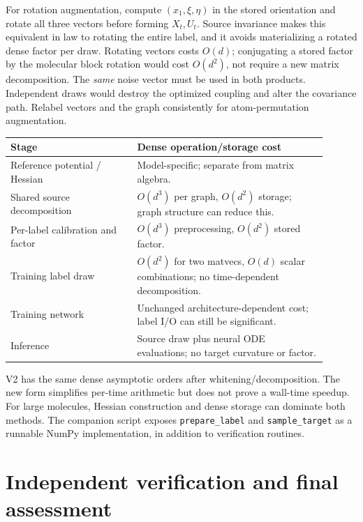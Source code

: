 \documentclass[11pt,letterpaper]{article}
\begin{document}
For rotation augmentation, compute $(x_1,\xi,\eta)$ in the stored orientation and rotate all three vectors before forming $X_t,U_t$. Source invariance makes this equivalent in law to rotating the entire label, and it avoids materializing a rotated dense factor per draw. Rotating vectors costs $O(d)$; conjugating a stored factor by the molecular block rotation would cost $O(d^2)$, not require a new matrix decomposition. The \emph{same} noise vector must be used in both products. Independent draws would destroy the optimized coupling and alter the covariance path. Relabel vectors and the graph consistently for atom-permutation augmentation.

\begin{center}\small
\begin{tabular}{p{0.36\linewidth}p{0.54\linewidth}}
\toprule
Stage & Dense operation/storage cost\\\midrule
Reference potential / Hessian & Model-specific; separate from matrix algebra.\\
Shared source decomposition & $O(d^3)$ per graph, $O(d^2)$ storage; graph structure can reduce this.\\
Per-label calibration and factor & $O(d^3)$ preprocessing, $O(d^2)$ stored factor.\\
Training label draw & $O(d^2)$ for two matvecs, $O(d)$ scalar combinations; no time-dependent decomposition.\\
Training network & Unchanged architecture-dependent cost; label I/O can still be significant.\\
Inference & Source draw plus neural ODE evaluations; no target curvature or factor.\\
\bottomrule
\end{tabular}
\end{center}

V2 has the same dense asymptotic orders after whitening/decomposition. The new form simplifies per-time arithmetic but does not prove a wall-time speedup. For large molecules, Hessian construction and dense storage can dominate both methods. The companion script exposes \texttt{prepare\_label} and \texttt{sample\_target} as a runnable NumPy implementation, in addition to verification routines.

\section{Independent verification and final assessment}
\label{sec:verification}
\end{document}

